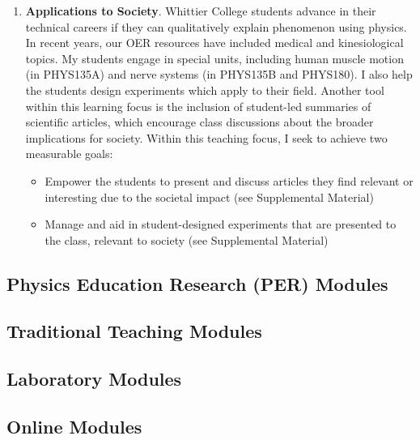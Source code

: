 \documentclass[../../../main.tex]{subfiles}
\begin{document}
\begin{enumerate}
\item \textbf{Applications to Society}. Whittier College students advance in their technical careers if they can qualitatively explain phenomenon using physics.  In recent years, our OER resources \cite{openstax1} \cite{openstax2} have included medical and kinesiological topics.  My students engage in special units, including human muscle motion (in PHYS135A) and nerve systems (in PHYS135B and PHYS180).  I also help the students design experiments which apply to their field. Another tool within this learning focus is the inclusion of student-led summaries of scientific articles, which encourage class discussions about the broader implications for society.  Within this teaching focus, I seek to achieve two measurable goals:

\begin{itemize}
\item Empower the students to present and discuss articles they find relevant or interesting due to the societal impact (see Supplemental Material)
\item Manage and aid in student-designed experiments that are presented to the class, relevant to society (see Supplemental Material)
\end{itemize}

\end{enumerate}

\subsection{Physics Education Research (PER) Modules}
\label{sec:per}

\subsection{Traditional Teaching Modules}
\label{sec:tt}

\subsection{Laboratory Modules}
\label{sec:la}

\subsection{Online Modules}
\label{sec:ola}
\end{document}

